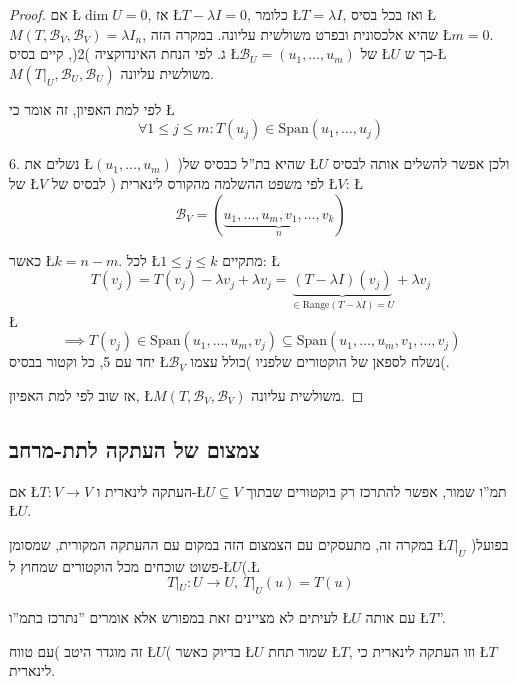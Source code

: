 \documentclass[english,hebrew]{article}
\begin{document}
\begin{proof}
אם \L{$\dim U=0$}, אז \L{$T-\lambda I=0$}, כלומר \L{$T=\lambda I$},
ואז בכל בסיס \L{$M(T,\mathcal{B}_{V},\mathcal{B}_{V})=\lambda I_{n}$},
שהיא אלכסונית ובפרט משולשית עליונה. במקרה הזה \L{$m=0$}.\\

ג. לפי הנחת האינדוקציה )2(, קיים בסיס \L{$\mathcal{B}_{U}=(u_{1},\dots,u_{m})$}
של \L{$U$} כך ש-\L{$M(T|_{U},\mathcal{B}_{U},\mathcal{B}_{U})$}
משולשית עליונה.

לפי למת האפיון, זה אומר כי \L{%
\[
\forall1\le j\le m:T(u_{j})\in\text{Span}(u_{1},\dots,u_{j})
\]
}%

6. נשלים את \L{$(u_{1},\dots,u_{m})$} )שהיא בת\textquotedblright ל
כבסיס של \L{$U$} ולכן אפשר להשלים אותה לבסיס של \L{$V$} לפי משפט
ההשלמה מהקורס לינארית {\endL}( לבסיס של \L{$V$}: \L{%
\[
\mathcal{B}_{V}=(\underset{n}{\underbrace{u_{1},\dots,u_{m},v_{1},\dots,v_{k}}})
\]
}%

כאשר \L{$k=n-m$}. לכל \L{$1\le j\le k$} מתקיים: \L{%
\[
T\left(v_{j}\right)=T\left(v_{j}\right)-\lambda v_{j}+\lambda v_{j}=\underset{\in\text{Range}(T-\lambda I)=U}{\underbrace{(T-\lambda I)(v_{j})}}+\lambda v_{j}
\]
}%
\L{%
\[
\implies T(v_{j})\in\text{Span}(u_{1},\dots,u_{m},v_{j})\subseteq\text{Span}(u_{1},\dots,u_{m},v_{1},\dots,v_{j})
\]
}%
יחד עם 5, כל וקטור בבסיס \L{$\mathcal{B}_{V}$} נשלח לספאן של הוקטורים
שלפניו )כולל עצמו(.

אז שוב לפי למת האפיון, \L{$M(T,\mathcal{B}_{V},\mathcal{B}_{V})$}
משולשית עליונה.
\end{proof}

\subsection{צמצום של העתקה לתת-מרחב}

אם \L{$T:V\rightarrow V$} העתקה לינארית ו-\L{$U\subseteq V$} תמ\textquotedblright ו
שמור, אפשר להתרכז רק בוקטורים שבתוך \L{$U$}.

במקרה זה, מתעסקים עם הצמצום הזה במקום עם ההעתקה המקורית, שמסומן \L{$T|_{U}$}
)בפועל פשוט שוכחים מכל הוקטורים שמחוץ ל-\L{$U$}(.\L{%
\[
T|_{U}:U\rightarrow U,\ T|_{U}(u)=T(u)
\]
}%

לעיתים לא מציינים זאת במפורש אלא אומרים \textquotedblright נתרכז בתמ\textquotedblright ו
\L{$U$} עם אותה \L{$T$}\textquotedblright .

זה מוגדר היטב )עם טווח \L{$U$}( בדיוק כאשר \L{$U$} שמור תחת \L{$T$},
וזו העתקה לינארית כי \L{$T$} לינארית.
\end{document}
